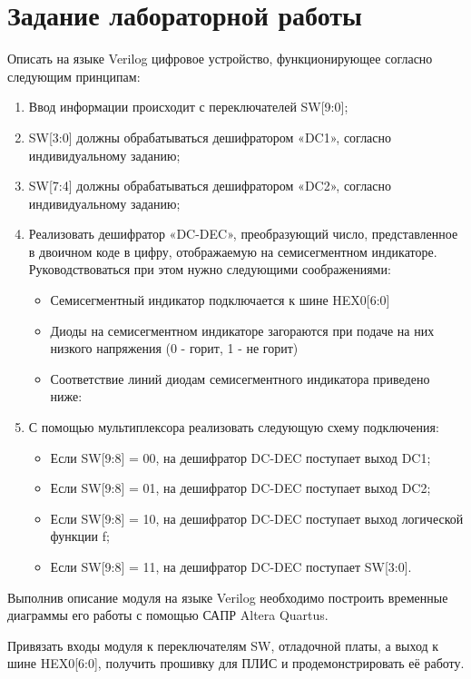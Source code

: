 \section{Задание лабораторной работы}
\par{Описать на языке Verilog цифровое устройство, функционирующее согласно следующим принципам:}
\begin{enumerate}
  \item Ввод информации происходит с переключателей SW[9:0];
  \item SW[3:0] должны обрабатываться дешифратором «DC1», согласно индивидуальному заданию;
  \item SW[7:4] должны обрабатываться дешифратором «DC2», согласно индивидуальному заданию;
  \item Реализовать дешифратор «DC-DEC», преобразующий число, представленное в двоичном коде в цифру, отображаемую на семисегментном индикаторе. Руководствоваться при этом нужно следующими соображениями:
    \begin{itemize}
      \item Семисегментный индикатор подключается к шине HEX0[6:0]
      \item Диоды на семисегментном индикаторе загораются при подаче на них низкого напряжения (0 - горит, 1 - не горит)
      \item Соответствие линий диодам семисегментного индикатора приведено ниже:
        \begin{figure}[H]
          \centering
          \def\svgwidth{\columnwidth}
          
          \label{fig:decoder}
        \end{figure}
    \end{itemize}
    \item С помощью мультиплексора реализовать следующую схему подключения:
      \begin{itemize}
        \item Если SW[9:8] = 00, на дешифратор DC-DEC поступает выход DC1;
        \item Если SW[9:8] = 01, на дешифратор DC-DEC поступает выход DC2;
        \item Если SW[9:8] = 10, на дешифратор DC-DEC поступает выход логической функции f;
        \item Если SW[9:8] = 11, на дешифратор DC-DEC поступает SW[3:0].
      \end{itemize}
\end{enumerate}

\par{Выполнив описание модуля на языке Verilog необходимо построить временные диаграммы его работы с помощью САПР Altera Quartus.}
\par{Привязать входы модуля к переключателям SW, отладочной платы, а выход к шине HEX0[6:0], получить прошивку для ПЛИС и продемонстрировать её работу.}
